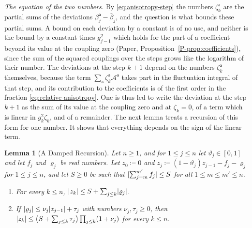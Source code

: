 \documentclass[11pt]{preprint}
\DeclarePairedDelimiter{\abs}{\lvert}{\rvert}
\numberwithin{equation}{section}
\newtheorem{lemma}[theorem]{Lemma}
\theoremstyle{definition}
\theoremstyle{remark}
\theoremstyle{plain}
\begin{document}
\emph{The equation of the two numbers.} By \eqref{eq:anisotropy-step} the numbers $\zeta^{\mathsf a}_k$ are the partial sums of the deviations $\beta^{\mathsf a}_{j} - \bar\beta_{j}$, and the question is what bounds these partial sums. A bound on each deviation by a constant is of no use, and neither is the bound by a constant times $g_{j-1}^2$ which holds for the part of a coefficient beyond its value at the coupling zero (Paper, Proposition~\ref{P-prop:coefficients}), since the sum of the squared couplings over the steps grows like the logarithm of their number. The deviations at the step $k + 1$ depend on the numbers $\zeta^{\mathsf a}_k$ themselves, because the term $\sum_{\mathsf a}\zeta^{\mathsf a}_k\mathcal A^{\mathsf a}$ takes part in the fluctuation integral of that step, and its contribution to the coefficients is of the first order in the fraction \eqref{eq:relative-anisotropy}. One is thus led to write the deviation at the step $k + 1$ as the sum of its value at the coupling zero and at $\zeta_k = 0$, of a term which is linear in $g_k^2\zeta_k$, and of a remainder. The next lemma treats a recursion of this form for one number. It shows that everything depends on the sign of the linear term.

\begin{lemma}[A Damped Recursion]\label{lem:damped-recursion}
Let $n \geq 1$, and for $1 \leq j \leq n$ let $\vartheta_j \in [0, 1]$ and let $f_j$ and $\varrho_j$ be real numbers. Let $z_0 \coloneqq 0$ and $z_j \coloneqq (1 - \vartheta_j)z_{j-1} - f_j - \varrho_j$ for $1 \leq j \leq n$, and let $S \geq 0$ be such that $\abs{\sum_{j=m}^{m'}f_j} \leq S$ for all $1 \leq m \leq m' \leq n$.
\begin{enumerate}[label=(\roman*)]
\item For every $k \leq n$, $\abs{z_k} \leq S + \sum_{j \leq k}\abs{\varrho_j}$.
\item If $\abs{\varrho_j} \leq \nu_j\abs{z_{j-1}} + \tau_j$ with numbers $\nu_j, \tau_j \geq 0$, then $\abs{z_k} \leq \bigl(S + \sum_{j \leq k}\tau_j\bigr)\prod_{j \leq k}(1 + \nu_j)$ for every $k \leq n$.
\end{enumerate}
\end{lemma}
\end{document}
